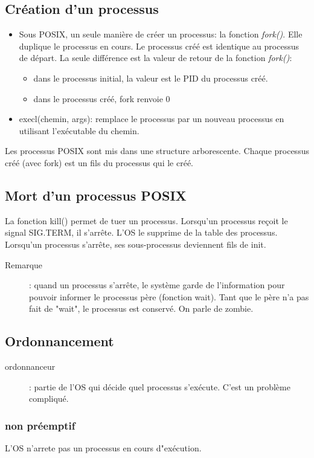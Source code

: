 \documentclass[10pt,a4paper]{article}
\begin{document}
	\subsection{Création d'un processus}
		\begin{itemize}
			\item Sous POSIX, un seule manière de créer un processus: la fonction \emph{fork()}. Elle duplique le processus en cours. Le processus créé est identique au processus de départ. La seule différence est la valeur de retour de la fonction \emph{fork()}:\begin{itemize}
				\item dans le processus initial, la valeur est le PID du processus créé.
				\item dans le processus créé, fork renvoie 0
			\end{itemize}

			\item execl(chemin, args): remplace le processus par un nouveau processus en utilisant l’exécutable du chemin.
		\end{itemize}
		Les processus POSIX sont mis dans une structure arborescente. Chaque processus créé (avec fork) est un fils du processus qui le créé.
	\subsection{Mort d'un processus POSIX}
		La fonction kill() permet de tuer un processus. Lorsqu'un processus reçoit le signal SIG.TERM, il s’arrête. L'OS le supprime de la table des processus. Lorsqu'un processus s'arrête, ses sous-processus deviennent fils de init.
		\begin{description}
			\item[Remarque]: quand un processus s'arrête, le système garde de l'information pour pouvoir informer le processus père (fonction wait). Tant que le père n'a pas fait de "wait", le processus est conservé. On parle de zombie.
		\end{description}
	\subsection{Ordonnancement}
		\begin{description}
			\item[ordonnanceur]: partie de l'OS qui décide quel processus s'exécute. C'est un problème compliqué.
		\end{description}
		\subsubsection{non préemptif}
			L'OS n’arrete pas un processus en cours d"exécution.
\end{document}
